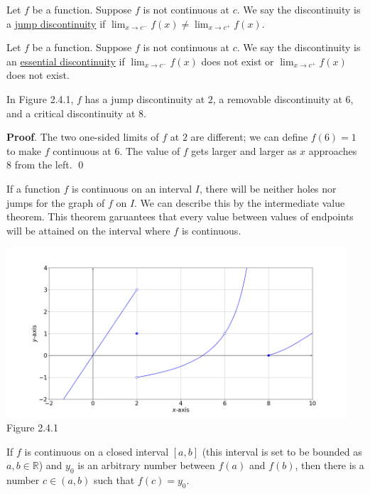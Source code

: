 \documentclass[11pt]{book}
\theoremstyle{break}
\theoremstyle{no_label}
\newcommand{\bbR}{\mathbb{R}}
\newcommand{\figtag}[1]{\\[-1.2em]Figure {#1}}
\numberwithin{equation}{section}
\begin{document}
\begin{definition}
    Let $f$ be a function. Suppose $f$ is not continuous at $c$. We say the discontinuity is a \underline{jump discontinuity} if $\displaystyle\lim_{x\to c^-}f(x)\ne\lim_{x\to c^+}f(x)$.
\end{definition}

\begin{definition}
    Let $f$ be a function. Suppose $f$ is not continuous at $c$. We say the discontinuity is an \underline{essential discontinuity} if $\displaystyle\lim_{x\to c^-}f(x)$ does not exist or $\displaystyle\lim_{x\to c^+}f(x)$ does not exist.
\end{definition}

\begin{example}
    In Figure 2.4.1, $f$ has a jump discontinuity at $2$, a removable discontinuity at $6$, and a critical discontinuity at $8$.
\end{example}
\textbf{Proof}. The two one-sided limits of $f$ at $2$ are different; we can define $f(6)=1$ to make $f$ continuous at $6$. The value of $f$ gets larger and larger as $x$ approaches $8$ from the left. \qed

If a function $f$ is continuous on an interval $I$, there will be neither holes nor jumps for the graph of $f$ on $I$. We can describe this by the intermediate value theorem. This theorem garuantees that every value between values of endpoints will be attained on the interval where $f$ is continuous.

\begin{center}
    \includegraphics[width=0.95\textwidth]{discontinuity.png}\figtag{2.4.1}
\end{center}

\begin{theorem}
    If $f$ is continuous on a closed interval $[a, b]$ (this interval is set to be bounded as $a, b\in\bbR$) and $y_0$ is an arbitrary number between $f(a)$ and $f(b)$, then there is a number $c\in(a, b)$ such that $f(c)=y_0$.
\end{theorem}
\end{document}
